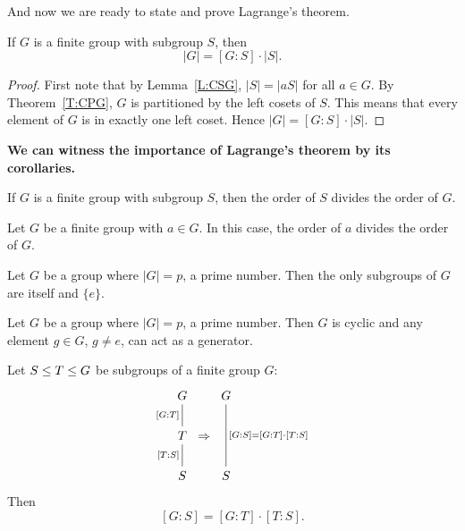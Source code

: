 \documentclass{ximera}
\begin{document}
And now we are ready to state and prove Lagrange's theorem.



\begin{theorem}\label{T:lagrange}
  If $G$ is a finite group with subgroup $S$, then 
  \[
  |G| = [G:S]\cdot |S|.
  \]
  \begin{proof}
    First note that by Lemma~\ref{L:CSG}, $|S| = |aS|$ for all
    $a\in G$. By Theorem~\ref{T:CPG}, $G$ is partitioned by the left
    cosets of $S$. This means that every element of $G$ is in exactly
    one left coset. Hence $|G| = [G:S]\cdot |S|$.
  \end{proof}
\end{theorem}

\textbf{We can witness the importance of Lagrange's theorem by its
corollaries.}

\begin{corollary}
  If $G$ is a finite group with subgroup $S$, then the order of $S$
  divides the order of $G$.
\end{corollary}

\begin{corollary}\label{C:Leodgo}
  Let $G$ be a finite group with $a\in G$. In this case, the order of
  $a$ divides the order of $G$.
\end{corollary}


\begin{corollary}
  Let $G$ be a group where $|G|= p$, a prime number. Then the only
  subgroups of $G$ are itself and $\{e\}$.
\end{corollary}

\begin{corollary}
  Let $G$ be a group where $|G|= p$, a prime number. Then $G$ is
  cyclic and any element $g\in G$, $g\ne e$, can act as a generator.
\end{corollary}


\begin{corollary}
  Let $S \leq T \leq G$ be subgroups of a finite group
  $G$:
  \[
  \begin{tikzcd}[column sep=0pt]
    G\ar[d,-,"{[G:T]}",swap] & & G\ar[dd,-,"{[G:S] = [G:T]\cdot [T:S]}"]\\
    T \ar[d,-,"{[T:S]}",swap] & \Rightarrow& \\
    S &  & S
  \end{tikzcd}
  \]
  Then
  \[
  [G:S] = [G:T]\cdot [T:S].
  \]
\end{corollary}
\end{document}
